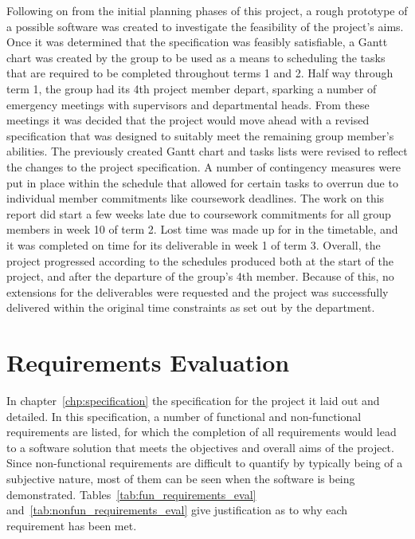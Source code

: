     Following on from the initial planning phases of this project, a rough prototype of a possible software was created to investigate the feasibility of the project's aims. Once it was determined that the specification was feasibly satisfiable, a Gantt chart was created by the group to be used as a means to scheduling the tasks that are required to be completed throughout terms 1 and 2. Half way through term 1, the group had its 4th project member depart, sparking a number of emergency meetings with supervisors and departmental heads. From these meetings it was decided that the project would move ahead with a revised specification that was designed to suitably meet the remaining group member's abilities. The previously created Gantt chart and tasks lists were revised to reflect the changes to the project specification. A number of contingency measures were put in place within the schedule that allowed for certain tasks to overrun due to individual member commitments like coursework deadlines. The work on this report did start a few weeks late due to coursework commitments for all group members in week 10 of term 2. Lost time was made up for in the timetable, and it was completed on time for its deliverable in week 1 of term 3. Overall, the project progressed according to the schedules produced both at the start of the project, and after the departure of the group's 4th member. Because of this, no extensions for the deliverables were requested and the project was successfully delivered within the original time constraints as set out by the department.

\section{Requirements Evaluation}

    In chapter~\ref{chp:specification} the specification for the project it laid out and detailed. In this specification, a number of functional and non-functional requirements are listed, for which the completion of all requirements would lead to a software solution that meets the objectives and overall aims of the project. Since non-functional requirements are difficult to quantify by typically being of a subjective nature, most of them can be seen when the software is being demonstrated. Tables~\ref{tab:fun_requirements_eval} and~\ref{tab:nonfun_requirements_eval} give justification as to why each requirement has been met.
    

